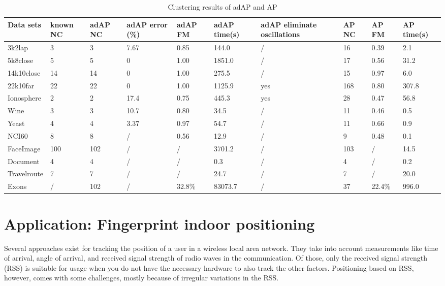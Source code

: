 \documentclass[11pt,a4paper]{article}
\begin{document}
\begin{table}[h]
	\begin{center}
		\begin{tabularx}{\textwidth}{@{}XYYYYYYYYY@{}}
			\hline
			Data sets&known NC  &adAP NC  &adAP error (\%) & adAP FM  &adAP time(s) & adAP eliminate oscillations  & AP NC  & AP FM  & AP time(s)  \\\hline
			3k2lap&3  &3  &7.67  &0.85  &144.0  &/  &16  &0.39  &2.1  \\
			5k8close&5  &5  &0  &1.00  &1851.0  &/  &17  &0.56  &31.2  \\
			14k10close&14  &14  &0  &1.00  &275.5  &/  &15  &0.97  &6.0  \\
			22k10far&22  &22  &0  &1.00  &1125.9  &yes  &168  &0.80  &307.8  \\
			Ionosphere&2  &2  &17.4  &0.75  &445.3  &yes  &28  &0.47  &56.8  \\
			Wine&3  &3  &10.7  &0.80  &34.5  &/  &11  &0.46  &0.5  \\
			Yeast&4  &4  &3.37  &0.97  &54.7  &/  &11  &0.66  &0.9  \\
			NCI60&8  &8  &/  &0.56  &12.9  &/  &9  &0.48  &0.1  \\
			FaceImage&100  &102  &/  &/  &3701.2  &/  &103  &/  &14.5  \\
			Document&4  &4  &/  &/  &0.3  &/  &4  &/  &0.2  \\
			Travelroute&7  &7  &/  &/  &24.7  &/  &7  &/  &20.0  \\
			Exons&/  &102  &/  &32.8\%  &83073.7  &/  &37  &22.4\%  &996.0\\\hline 
		\end{tabularx}
	\end{center}
	
	\caption{Clustering results of adAP and AP \cite{wang2008adaptive}}
	\label{tbl:adapres}
\end{table}
\pagebreak
\section{Application: Fingerprint indoor positioning}
Several approaches exist for tracking the position of a user in a wireless local area network. They take into account measurements like time of arrival, angle of arrival, and received signal strength of radio waves in the communication. Of those, only the received signal strength (RSS) is suitable for usage when you do not have the necessary hardware to also track the other factors. Positioning based on RSS, however, comes with some challenges, mostly because of irregular variations in the RSS. \cite{tian2013fingerprint}
\end{document}
